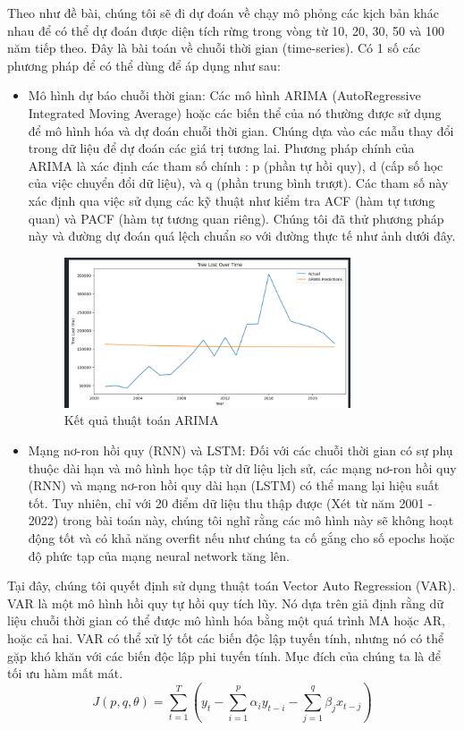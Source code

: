 \documentclass[a4paper,12pt]{report}
\begin{document}
\begin{flushleft}
	Theo như đề bài, chúng tôi sẽ đi dự đoán về chạy mô phỏng các kịch bản khác nhau để có thể dự đoán được diện tích rừng trong vòng từ 10, 20, 30, 50 và 100 năm tiếp theo.  Đây là bài toán về chuỗi thời gian (time-series). Có 1 số các phương pháp để có thể dùng để áp dụng như sau:
	\begin{itemize}
		\item Mô hình dự báo chuỗi thời gian: Các mô hình ARIMA (AutoRegressive Integrated Moving Average) hoặc các biến thể của nó thường được sử dụng để mô hình hóa và dự đoán chuỗi thời gian. Chúng dựa vào các mẫu thay đổi trong dữ liệu để dự đoán các giá trị tương lai. Phương pháp chính của ARIMA là xác định các tham số  chính : p (phần tự hồi quy), d (cấp số học của việc chuyển đổi dữ liệu), và q (phần trung bình trượt). Các tham số này xác định qua việc sử dụng các kỹ thuật như kiểm tra ACF (hàm tự tương quan) và PACF (hàm tự tương quan riêng). Chúng tôi đã thử phương pháp này và đường dự đoán quá lệch chuẩn so với đường thực tế như ảnh dưới đây.
		\begin{figure}[H]
			\centering
			\includegraphics[width = 0.8\textwidth]{images/ARIMA.png}
			\caption{Kết quả thuật toán ARIMA}
		\end{figure}

		\item Mạng nơ-ron hồi quy (RNN) và LSTM: Đối với các chuỗi thời gian có sự phụ thuộc dài hạn và mô hình học tập từ dữ liệu lịch sử, các mạng nơ-ron hồi quy (RNN) và mạng nơ-ron hồi quy dài hạn (LSTM) có thể mang lại hiệu suất tốt. Tuy nhiên, chỉ với 20 điểm dữ liệu thu thập được (Xét từ năm 2001 - 2022) trong bài toán này, chúng tôi nghĩ rằng các mô hình này sẽ không hoạt động tốt và có khả năng overfit nếu như chúng ta cố gắng cho số epochs hoặc độ phức tạp của mạng neural network tăng lên.
	\end{itemize}

	Tại đây, chúng tôi quyết định sử dụng thuật toán Vector Auto Regression (VAR). VAR là một mô hình hồi quy tự hồi quy tích lũy. Nó dựa trên giả định rằng dữ liệu chuỗi thời gian có thể được mô hình hóa bằng một quá trình MA hoặc AR, hoặc cả hai. VAR có thể xử lý tốt các biến độc lập tuyến tính, nhưng nó có thể gặp khó khăn với các biến độc lập phi tuyến tính. Mục đích của chúng ta là để tối ưu hàm mất mát.
	$$
		J(p, q, \theta) = \sum\limits_{t = 1}^{T} \left(y_{t} - \sum\limits_{i = 1}^{p} \alpha_{i}y_{t - i} - \sum\limits_{j = 1}^{q} \beta_{j}x_{t - j} \right)
	$$


\end{flushleft}
\end{document}
